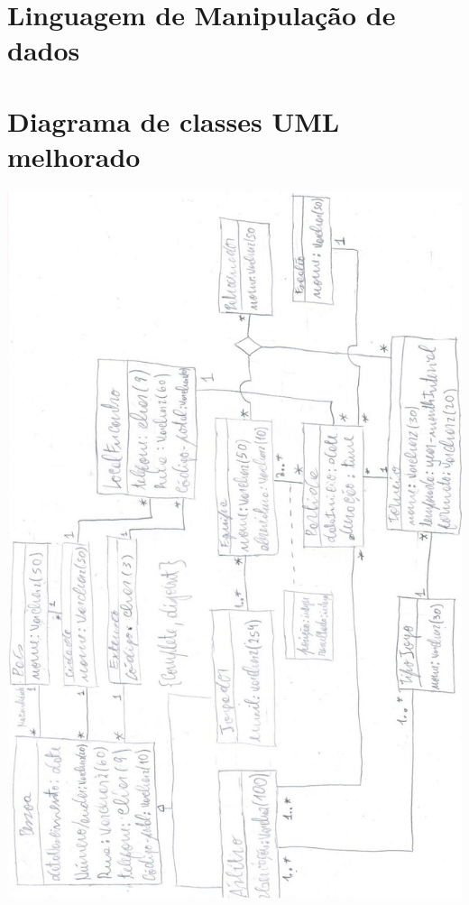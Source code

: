 \documentclass[a4paper]{article}
\begin{document}
\section{Linguagem de Manipulação de dados}

\section{Diagrama de classes UML melhorado}
\includegraphics[scale=0.6]{./BDAD_DIAGRAMA_CORRIGIDO.jpeg}
\end{document}
